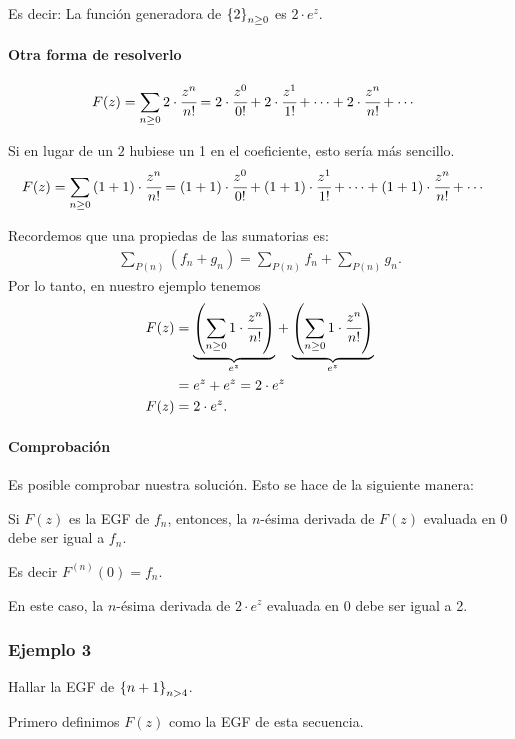 Es decir: La función generadora de $\left\{2\right\}_{n\geq0}$ es $2\cdot e^z$.

\paragraph{Otra forma de resolverlo}

\begin{align*}
F(z)&=\sum_{n\geq0}{2\cdot \cfrac{z^{n}}{n!}}=2\cdot\cfrac{z^{0}}{0!}+2\cdot\cfrac{z^{1}}{1!}+\cdots+2\cdot\cfrac{z^{n}}{n!}+\cdots
\end{align*}

Si en lugar de un $2$ hubiese un 1 en el coeficiente, esto sería más sencillo.
\begin{align*}
F(z)&=\sum_{n\geq0}{(1+1)\cdot \cfrac{z^{n}}{n!}}=(1+1)\cdot\cfrac{z^{0}}{0!}+(1+1)\cdot\cfrac{z^{1}}{1!}+\cdots+(1+1)\cdot\cfrac{z^{n}}{n!}+\cdots
\end{align*}

Recordemos que una propiedas de las sumatorias es:
\begin{align*}
\sum_{P(n)}{\left(f_n+g_n\right)}=\sum_{P(n)}{f_n}+\sum_{P(n)}{g_n}.
\end{align*}
Por lo tanto, en nuestro ejemplo tenemos
\begin{align*}
F(z)&=\underset{e^z}{\underbrace{\left(\sum_{n\geq0}{1\cdot \cfrac{z^{n}}{n!}}\right)}}+\underset{e^z}{\underbrace{\left(\sum_{n\geq0}{1\cdot \cfrac{z^{n}}{n!}}\right)}}\\
&=e^z+e^z=2\cdot e^z\\
F(z)&=2\cdot e^z.
\end{align*}

\paragraph{Comprobación}
Es posible comprobar nuestra solución. Esto se hace de la siguiente manera:

Si $F(z)$ es la EGF de $f_n$, entonces, la $n$-ésima derivada de $F(z)$ evaluada en 0 debe ser igual a $f_n$.

Es decir $F^{(n)}(0)=f_n.$

En este caso, la $n$-ésima derivada de $2\cdot e^z$ evaluada en 0 debe ser igual a 2.

\subsubsection{Ejemplo 3}

Hallar la EGF de $\left\{n+1\right\}_{n>4}$.

Primero definimos $F(z)$ como la EGF de esta secuencia.

